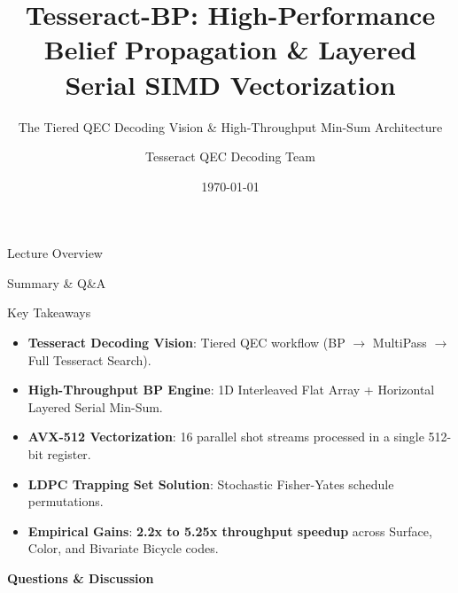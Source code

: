 \documentclass[aspectratio=169, 10pt]{beamer}
\title[Tesseract-BP Architecture]{Tesseract-BP: High-Performance Belief Propagation \& Layered Serial SIMD Vectorization}
\subtitle{The Tiered QEC Decoding Vision \& High-Throughput Min-Sum Architecture}
\author[Tesseract Team]{Tesseract QEC Decoding Team}
\institute[Google DeepMind]{Advanced Agentic Coding / Quantum Decoding Group}
\date{\today}
\begin{document}
\begin{frame}
    \titlepage
\end{frame}

\begin{frame}{Lecture Overview}
    \tableofcontents
\end{frame}






\begin{frame}{Summary \& Q\&A}
    \begin{block}{Key Takeaways}
        \begin{itemize}
            \item \textbf{Tesseract Decoding Vision}: Tiered QEC workflow (BP $\rightarrow$ MultiPass $\rightarrow$ Full Tesseract Search).
            \item \textbf{High-Throughput BP Engine}: 1D Interleaved Flat Array + Horizontal Layered Serial Min-Sum.
            \item \textbf{AVX-512 Vectorization}: 16 parallel shot streams processed in a single 512-bit register.
            \item \textbf{LDPC Trapping Set Solution}: Stochastic Fisher-Yates schedule permutations.
            \item \textbf{Empirical Gains}: \textbf{2.2x to 5.25x throughput speedup} across Surface, Color, and Bivariate Bicycle codes.
        \end{itemize}
    \end{block}
    \centerline{\Huge\textcolor{googleblue}{\textbf{Questions \& Discussion}}}
\end{frame}
\end{document}
